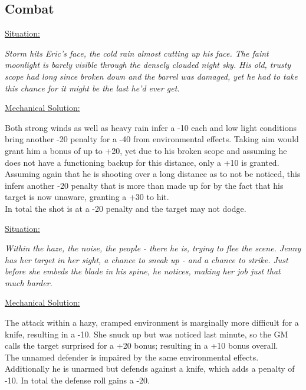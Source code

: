 \subsection*{Combat}
\vspace{5mm}
\begin{multicols}{2}
	\ul{Situation:}
	\begin{exampleblock}
		\textit{Storm hits Eric’s face, the cold rain almost cutting up his face. The faint moonlight is barely visible through the densely clouded night sky. His old, trusty scope had long since broken down and the barrel was damaged, yet he had to take this chance for it might be the last he’d ever get.}
	\end{exampleblock}
	\ul{Mechanical Solution:}
	\begin{exampleblock}
		Both strong winds as well as heavy rain infer a -10 each and low light conditions bring another -20 penalty for a -40 from environmental effects. Taking aim would grant him a bonus of up to +20, yet due to his broken scope and assuming he does not have a functioning backup for this distance, only a +10 is granted. Assuming again that he is shooting over a long distance as to not be noticed, this infers another -20 penalty that is more than made up for by the fact that his target is now unaware, granting a +30 to hit.\\
		In total the shot is at a -20 penalty and the target may not dodge.
	\end{exampleblock}
	\columnbreak
	\ul{Situation:}
	\begin{exampleblock}
		\textit{Within the haze, the noise, the people - there he is, trying to flee the scene. Jenny has her target in her sight, a chance to sneak up - and a chance to strike. Just before she embeds the blade in his spine, he notices, making her job just that much harder.}
	\end{exampleblock}
	\ul{Mechanical Solution:}
	\begin{exampleblock}
		The attack within a hazy, cramped environment is marginally more difficult for a knife, resulting in a -10. She snuck up but was noticed last minute, so the GM calls the target surprised for a +20 bonus; resulting in a +10 bonus overall.\\
		The unnamed defender is impaired by the same environmental effects. Additionally he is unarmed but defends against a knife, which adds a penalty of -10. In total the defense roll gains a -20.
	\end{exampleblock}
\end{multicols}

